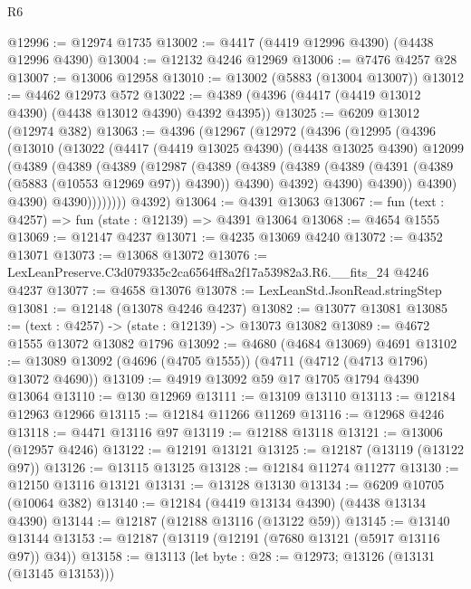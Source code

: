 \begin{lexlean}{R6}
\begin{coremodule}
@12996 := @12974 @1735
@13002 := @4417 (@4419 @12996 @4390) (@4438 @12996 @4390)
@13004 := @12132 @4246 @12969
@13006 := @7476 @4257 @28
@13007 := @13006 @12958
@13010 := @13002 (@5883 (@13004 @13007))
@13012 := @4462 @12973 @572
@13022 := @4389 (@4396 (@4417 (@4419 @13012 @4390) (@4438 @13012 @4390) @4392 @4395))
@13025 := @6209 @13012 (@12974 @382)
@13063 := @4396
    (@12967
      (@12972
        (@4396
          (@12995
            (@4396
              (@13010
                (@13022
                  (@4417
                    (@4419 @13025 @4390)
                    (@4438 @13025 @4390)
                    @12099
                    (@4389
                      (@4389
                        (@4389
                          (@12987
                            (@4389
                              (@4389
                                (@4389
                                  (@4389 (@4391 (@4389 (@5883 (@10553 @12969 @97)) @4390)) @4390)
                                  @4392)
                                @4390)
                              @4390))
                          @4390)
                        @4390)
                      @4390))))))))
      @4392)
@13064 := @4391 @13063
@13067 := fun (text : @4257) => fun (state : @12139) => @4391 @13064
@13068 := @4654 @1555
@13069 := @12147 @4237
@13071 := @4235 @13069 @4240
@13072 := @4352 @13071
@13073 := @13068 @13072
@13076 := LexLeanPreserve.C3d079335c2ca6564ff8a2f17a53982a3.R6.__fits_24 @4246 @4237
@13077 := @4658 @13076
@13078 := LexLeanStd.JsonRead.stringStep
@13081 := @12148 (@13078 @4246 @4237)
@13082 := @13077 @13081
@13085 := (text : @4257) -> (state : @12139) -> @13073 @13082
@13089 := @4672 @1555 @13072 @13082 @1796
@13092 := @4680 (@4684 @13069) @4691
@13102 := @13089 @13092 (@4696 (@4705 @1555)) (@4711 (@4712 (@4713 @1796) @13072 @4690))
@13109 := @4919 @13092 @59 @17 @1705 @1794 @4390 @13064
@13110 := @130 @12969
@13111 := @13109 @13110
@13113 := @12184 @12963 @12966
@13115 := @12184 @11266 @11269
@13116 := @12968 @4246
@13118 := @4471 @13116 @97
@13119 := @12188 @13118
@13121 := @13006 (@12957 @4246)
@13122 := @12191 @13121
@13125 := @12187 (@13119 (@13122 @97))
@13126 := @13115 @13125
@13128 := @12184 @11274 @11277
@13130 := @12150 @13116 @13121
@13131 := @13128 @13130
@13134 := @6209 @10705 (@10064 @382)
@13140 := @12184 (@4419 @13134 @4390) (@4438 @13134 @4390)
@13144 := @12187 (@12188 @13116 (@13122 @59))
@13145 := @13140 @13144
@13153 := @12187 (@13119 (@12191 (@7680 @13121 (@5917 @13116 @97)) @34))
@13158 := @13113 (let byte : @28 := @12973; @13126 (@13131 (@13145 @13153)))

\end{coremodule}
\end{lexlean}
